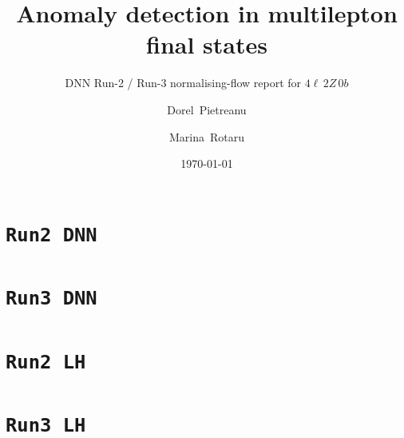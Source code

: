 \documentclass[10pt,aspectratio=169]{beamer}
\title[AD-ML]{Anomaly detection in multilepton final states}
\subtitle{DNN Run-2 / Run-3 normalising-flow report for $4\ell\,2Z\,0b$}
\author[D. Pietreanu, M. Rotaru]{Dorel~Pietreanu \and Marina~Rotaru}
\date{\today}
\begin{document}
\begin{frame}
\titlepage
\end{frame}
\logo{}



\section{\texttt{Run2 DNN}}


\section{\texttt{Run3 DNN}}


\section{\texttt{Run2 LH}}


\section{\texttt{Run3 LH}}

\end{document}
